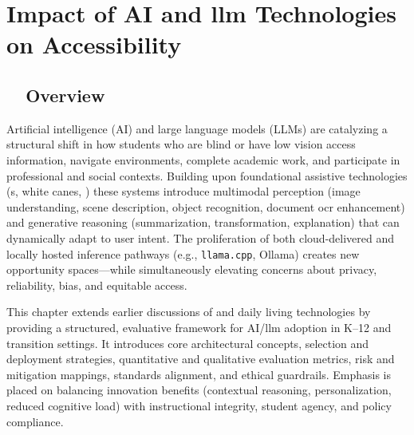 \chapter{Impact of AI and \gls{llm} Technologies on Accessibility}\label{ch9:chap:ai-llm}

\section{~~Overview}\label{ch9:sec:overview}
Artificial intelligence (AI) and large language models (LLMs) are catalyzing a structural shift in how students who are blind or have low vision access information, navigate environments, complete academic work, and participate in professional and social contexts.\supercite{arxiv_visual_impairment, msseeingai, aimodels2024} Building upon foundational assistive technologies (s, white canes, ) these systems introduce multimodal perception (image understanding, scene description, object recognition, document \gls{ocr} enhancement) and generative reasoning (summarization, transformation, explanation) that can dynamically adapt to user intent.\supercite{SeeingAI, IBMAIOCR, ABBYYAIOCR} The proliferation of both cloud-delivered and locally hosted inference pathways (e.g., \texttt{llama.cpp}, Ollama)\supercite{LlamaCpp, Ollama} creates new opportunity spaces—while simultaneously elevating concerns about privacy, reliability, bias, and equitable access.\supercite{AI_Ethics_Bias, Bias_in_AI, DataPrivacyAI}

This chapter extends earlier discussions of  and daily living technologies by providing a structured, evaluative framework for AI/\gls{llm} adoption in K–12 and transition settings. It introduces core architectural concepts, selection and deployment strategies, quantitative and qualitative evaluation metrics, risk and mitigation mappings, standards alignment, and ethical guardrails. Emphasis is placed on balancing innovation benefits (contextual reasoning, personalization, reduced cognitive load) with instructional integrity, student agency, and policy compliance.\supercite{wjaets2024, MicrosoftAIAccessibility, GoogleMLAccessibility}

